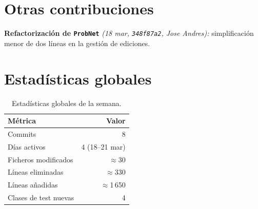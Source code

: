 \documentclass[11pt,a4paper]{article}
\begin{document}
\section{Otras contribuciones}

\textbf{Refactorización de \texttt{ProbNet}} \emph{(18 mar, \texttt{348f87a2}, Jose Andres):}
simplificación menor de dos líneas en la gestión de ediciones.

\section*{Estadísticas globales}

\begin{table}[!htbp]
\centering
\begin{tabular}{lr}
\toprule
\textbf{Métrica} & \textbf{Valor} \\
\midrule
Commits                             & 8 \\
Días activos                        & 4 (18–21 mar) \\
Ficheros modificados                & $\approx$30 \\
Líneas eliminadas                   & $\approx$330 \\
Líneas añadidas                     & $\approx$1\,650 \\
Clases de test nuevas               & 4 \\
\bottomrule
\end{tabular}
\caption{Estadísticas globales de la semana.}
\end{table}
\end{document}
